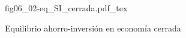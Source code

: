 \begin{figure}[h]
\centering
\def\svgwidth{0.5\textwidth}
{fig06_02-eq_SI_cerrada.pdf_tex}
\caption{Equilibrio ahorro-inversión en economía cerrada}
\label{fig06_02-eq_SI_cerrada}
\end{figure}